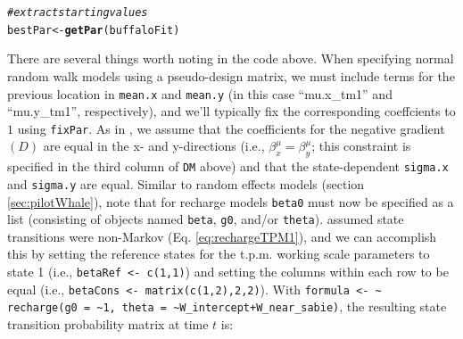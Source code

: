 \documentclass[12pt]{article}\usepackage[]{graphicx}\usepackage[]{color}
\makeatletter
\newcommand{\hlcom}[1]{\textcolor[rgb]{0.678,0.584,0.686}{\textit{#1}}}%
\newcommand{\hlstd}[1]{\textcolor[rgb]{0.345,0.345,0.345}{#1}}%
\newcommand{\hlkwb}[1]{\textcolor[rgb]{0.69,0.353,0.396}{#1}}%
\newcommand{\hlkwd}[1]{\textcolor[rgb]{0.737,0.353,0.396}{\textbf{#1}}}%
\newenvironment{kframe}{%
 \def\at@end@of@kframe{}%
 \ifinner\ifhmode%
  \def\at@end@of@kframe{\end{minipage}}%
  \begin{minipage}{\columnwidth}%
 \fi\fi%
 \def\FrameCommand##1{\hskip\@totalleftmargin \hskip-\fboxsep
 \colorbox{shadecolor}{##1}\hskip-\fboxsep
     \hskip-\linewidth \hskip-\@totalleftmargin \hskip\columnwidth}%
 \MakeFramed {\advance\hsize-\width
   \@totalleftmargin\z@ \linewidth\hsize
   \@setminipage}}%
 {\par\unskip\endMakeFramed%
 \at@end@of@kframe}
\newenvironment{knitrout}{}{} %
\makeatother
\begin{document}
\begin{knitrout}
\begin{kframe}
{\ttfamily\noindent\itshape\color{messagecolor}{\#\# =======================================================================}}

{\ttfamily\noindent\itshape\color{messagecolor}{\#\# Fitting HMM with 2 states and 1 data stream}}

{\ttfamily\noindent\itshape\color{messagecolor}{\#\# -----------------------------------------------------------------------}}

{\ttfamily\noindent\itshape{}}

{\ttfamily\noindent\itshape{}}

{\ttfamily\noindent\itshape{}}

{\ttfamily\noindent\itshape\color{messagecolor}{\#\# =======================================================================}}

{\ttfamily\noindent\itshape\color{messagecolor}{\#\# DONE}}\begin{alltt}
\hlcom{# extract starting values}
\hlstd{bestPar} \hlkwb{<-} \hlkwd{getPar}\hlstd{(buffaloFit)}
\end{alltt}
\end{kframe}
\end{knitrout}
\noindent There are several things worth noting in the code above. When specifying normal random walk models using a pseudo-design matrix, we must include terms for the previous location in \verb|mean.x| and \verb|mean.y| (in this case ``mu.x\_tm1'' and ``mu.y\_tm1'', respectively), and we'll typically fix the corresponding coeffcients to $1$ using \verb|fixPar|. As in \cite{HootenEtAl2019}, we assume that the coefficients for the negative gradient $(D)$ are equal in the x- and y-directions (i.e., $\beta^\mu_x = \beta^\mu_y$; this constraint is specified in the third column of \verb|DM| above) and that the state-dependent \verb|sigma.x| and \verb|sigma.y| are equal. Similar to random effects models (section \ref{sec:pilotWhale}), note that for recharge models \verb|beta0| must now be specified as a list (consisting of objects named \verb|beta|, \verb|g0|, and/or \verb|theta|). \cite{HootenEtAl2019} assumed state transitions were non-Markov (Eq. \ref{eq:rechargeTPM1}), and we can accomplish this by setting the reference states for the t.p.m. working scale parameters to state 1 (i.e., \verb|betaRef <- c(1,1)|) and setting the columns within each row to be equal (i.e., \verb|betaCons <- matrix(c(1,2),2,2)|). With \verb|formula <- ~ recharge(g0 = ~1, theta = ~W_intercept+W_near_sabie)|, the resulting state transition probability matrix at time $t$ is:
\end{document}

